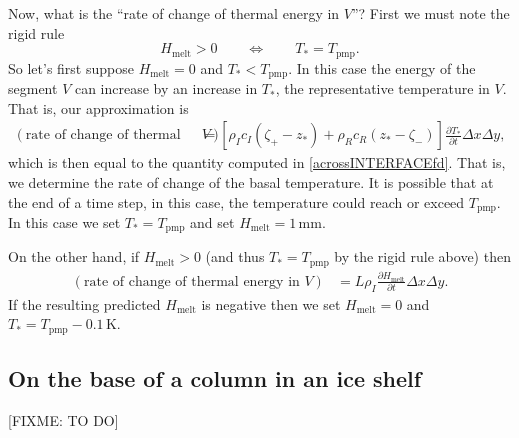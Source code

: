 \documentclass[12pt,final]{amsart}%
\theoremstyle{plain}
\theoremstyle{definition}
\theoremstyle{remark}
\newcommand{\ddt}[1]{\ensuremath{\frac{\partial #1}{\partial t}}}
\newcommand{\Tpmp}{T_{\text{pmp}}}
\begin{document}
Now, what is the ``rate of change of thermal energy in $V$''?  First we must note the rigid rule
    $$H_{\text{melt}} > 0 \qquad \iff \qquad T_\ast = \Tpmp.$$
So let's first suppose $H_{\text{melt}} = 0$ and $T_\ast < \Tpmp$.  In this case the energy of the segment $V$ can increase by an increase in $T_\ast$, the representative temperature in $V$.  That is, our approximation is
\begin{align*}
\left(\text{rate of change of thermal energy in }V\right) &= \left[\rho_I c_I (\zeta_+ - z_\ast) + \rho_R c_R (z_\ast - \zeta_-)\right] \ddt{T_\ast} \Delta x \Delta y,
\end{align*}
which is then equal to the quantity computed in \eqref{acrossINTERFACEfd}.  That is, we determine the rate of change of the basal temperature.  It is possible that at the end of a time step, in this case, the temperature could reach or exceed $\Tpmp$.  In this case we set $T_\ast=\Tpmp$ and set $H_{\text{melt}} = 1\,\text{mm}$.

On the other hand, if $H_{\text{melt}} > 0$ (and thus $T_\ast = \Tpmp$ by the rigid rule above) then
\begin{align*}
\left(\text{rate of change of thermal energy in }V\right) &= L \rho_I \ddt{H_{\text{melt}}} \Delta x \Delta y.
\end{align*}
If the resulting predicted $H_{\text{melt}}$ is negative then we set $H_{\text{melt}} = 0$ and $T_\ast=\Tpmp - 0.1\,\text{K}$.



\subsection*{On the base of a column in an ice shelf}  [FIXME: TO DO]



\newpage


\end{document}
